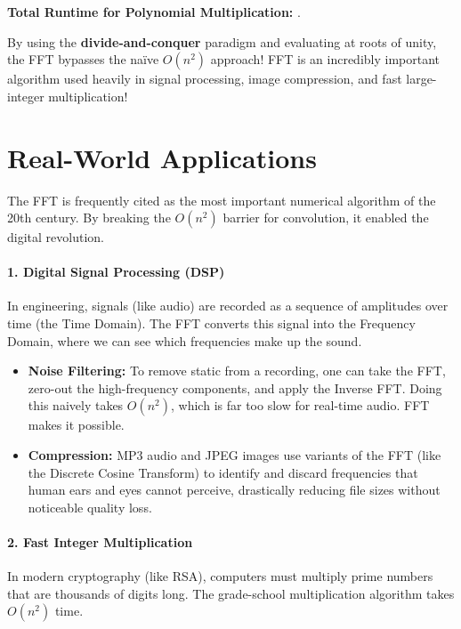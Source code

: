 \documentclass[11  pt]{article}
\begin{document}
\vs{1cm}

\textbf{Total Runtime for Polynomial Multiplication:} . \\

\vs{0.5cm}

By using the \textbf{divide-and-conquer} paradigm and evaluating at roots of unity, the FFT bypasses the na\"{i}ve $O(n^2)$ approach! 
FFT is an incredibly important algorithm used heavily in signal processing, image compression, and fast large-integer multiplication!

\newpage

\section{Real-World Applications}

The FFT is frequently cited as the most important numerical algorithm of the 20th century. By breaking the $O(n^2)$ barrier for convolution, it enabled the digital revolution. 

\vs{0.5cm}

\paragraph{1. Digital Signal Processing (DSP)}
In engineering, signals (like audio) are recorded as a sequence of amplitudes over time (the Time Domain). The FFT converts this signal into the Frequency Domain, where we can see which frequencies make up the sound.
\begin{itemize}
    \item \textbf{Noise Filtering:} To remove static from a recording, one can take the FFT, zero-out the high-frequency components, and apply the Inverse FFT. Doing this naively takes $O(n^2)$, which is far too slow for real-time audio. FFT makes it possible.
    \item \textbf{Compression:} MP3 audio and JPEG images use variants of the FFT (like the Discrete Cosine Transform) to identify and discard frequencies that human ears and eyes cannot perceive, drastically reducing file sizes without noticeable quality loss.
\end{itemize}

\vs{1cm}

\paragraph{2. Fast Integer Multiplication}
In modern cryptography (like RSA), computers must multiply prime numbers that are thousands of digits long. The grade-school multiplication algorithm takes $O(n^2)$ time. 
\end{document}
